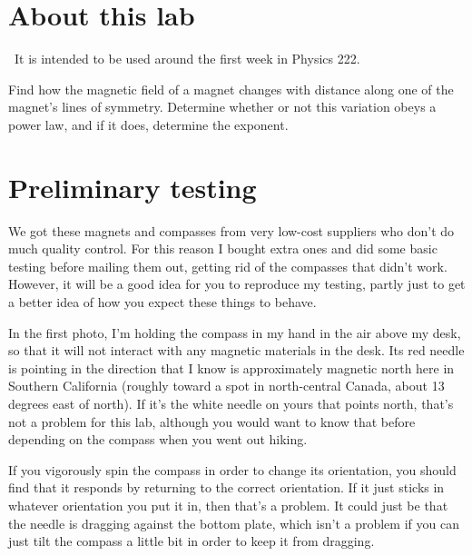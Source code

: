 \renewcommand\thechapter{c2.1}
\label{lab:field-of-a-permanent-magnet}

\section*{About this lab}

\covid\ 
It is intended to be used around the first week in Physics 222.

\apparatus
{}

\begin{goals}

\item[] Find how the magnetic field of a magnet changes with
distance along one of the magnet's lines of symmetry. Determine whether
or not this variation obeys a power law, and if it does, determine the
exponent.

\end{goals}


\section*{Preliminary testing}

We got these magnets and compasses from very low-cost suppliers who don't do much
quality control. For this reason I bought extra ones and did some basic testing
before mailing them out, getting rid of the compasses that didn't work.
However, it will be a good idea for you to reproduce my
testing, partly just to get a better idea of how you expect these things to behave.

In the first photo, I'm holding the compass in my hand in the air above my desk, so
that it will not interact with any magnetic materials in the desk. Its red needle is
pointing in the direction that I know is approximately magnetic north here in
Southern California (roughly toward a spot in north-central Canada, about 13 degrees
east of north). If it's the white needle on yours that points north, that's not a
problem for this lab, although you would want to know that before depending on
the compass when you went out hiking.


If you vigorously spin the compass in order
to change its orientation, you should find that it responds by returning to the
correct orientation. If it just sticks in whatever orientation you put it in, then that's
a problem. It could just be that the needle is dragging against the bottom plate, which
isn't a problem if you can just tilt the compass a little bit in order to keep it from
dragging.

